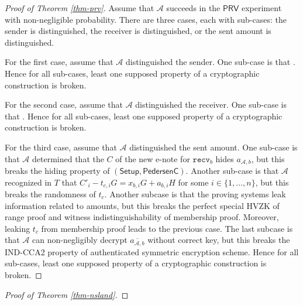 \documentclass{article}
\begin{document}
\begin{proof}[Proof of Theorem \ref{thm-prv}]
Assume that $\mathcal{A}$ succeeds in the $\textsf{PRV}$ experiment with non-negligible probability. There are three cases, each with sub-cases: the sender is distinguished, the receiver is distinguished, or the sent amount is distinguished.

For the first case, assume that $\mathcal{A}$ distinguished the sender. One sub-case is that . Hence for all sub-cases, least one supposed property of a cryptographic construction is broken.

For the second case, assume that $\mathcal{A}$ distinguished the receiver. One sub-case is that . Hence for all sub-cases, least one supposed property of a cryptographic construction is broken.

For the third case, assume that $\mathcal{A}$ distinguished the sent amount. One sub-case is that $\mathcal{A}$ determined that the $C$ of the new e-note for $\texttt{recv}_b$ hides $a_{\mathcal{A}, b}$, but this breaks the hiding property of $(\textsf{Setup}, \textsf{PedersenC})$. Another sub-case is that $\mathcal{A}$ recognized in $T$ that $C'_i - t_{c, i}G = x_{b,i}G + a_{b,i}H$ for some $i \in \{1, \ldots, n\}$, but this breaks the randomness of $t_c$. Another subcase is that the proving systems leak information related to amounts, but this breaks the perfect special HVZK of range proof and witness indistinguishability of membership proof. Moreover, leaking $t_c$ from membership proof leads to the previous case. The last subcase is that $\mathcal{A}$ can non-negligibly decrypt $\overline{a_{\mathcal{A},b}}$ without correct key, but this breaks the IND-CCA2 property of authenticated symmetric encryption scheme. Hence for all sub-cases, least one supposed property of a cryptographic construction is broken.
\end{proof}
\begin{proof}[Proof of Theorem \ref{thm-nsland}]
\end{proof}
\end{document}
